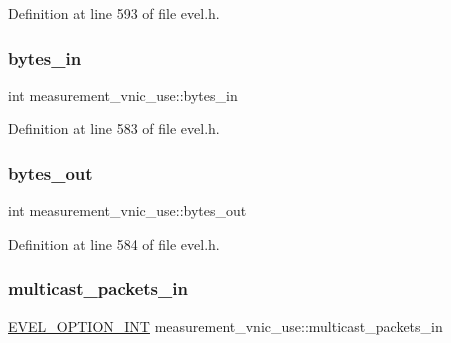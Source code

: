 Definition at line 593 of file evel.\+h.

\hypertarget{structmeasurement__vnic__use_ad6289ea98d480dfc89aff65304ac665c}{}\label{structmeasurement__vnic__use_ad6289ea98d480dfc89aff65304ac665c} 
\subsubsection{\texorpdfstring{bytes\+\_\+in}{bytes\_in}}
{\footnotesize\ttfamily int measurement\+\_\+vnic\+\_\+use\+::bytes\+\_\+in}



Definition at line 583 of file evel.\+h.

\hypertarget{structmeasurement__vnic__use_a3531ca46c61940621cea0f4d34f58855}{}\label{structmeasurement__vnic__use_a3531ca46c61940621cea0f4d34f58855} 
\subsubsection{\texorpdfstring{bytes\+\_\+out}{bytes\_out}}
{\footnotesize\ttfamily int measurement\+\_\+vnic\+\_\+use\+::bytes\+\_\+out}



Definition at line 584 of file evel.\+h.

\hypertarget{structmeasurement__vnic__use_a8145b9c9be62f0d1b50d27572e6a2b3f}{}\label{structmeasurement__vnic__use_a8145b9c9be62f0d1b50d27572e6a2b3f} 
\subsubsection{\texorpdfstring{multicast\+\_\+packets\+\_\+in}{multicast\_packets\_in}}
{\footnotesize\ttfamily \hyperlink{evel_8h_a452d825778d1c2368a54b8f689a25ba7}{E\+V\+E\+L\+\_\+\+O\+P\+T\+I\+O\+N\+\_\+\+I\+NT} measurement\+\_\+vnic\+\_\+use\+::multicast\+\_\+packets\+\_\+in}



